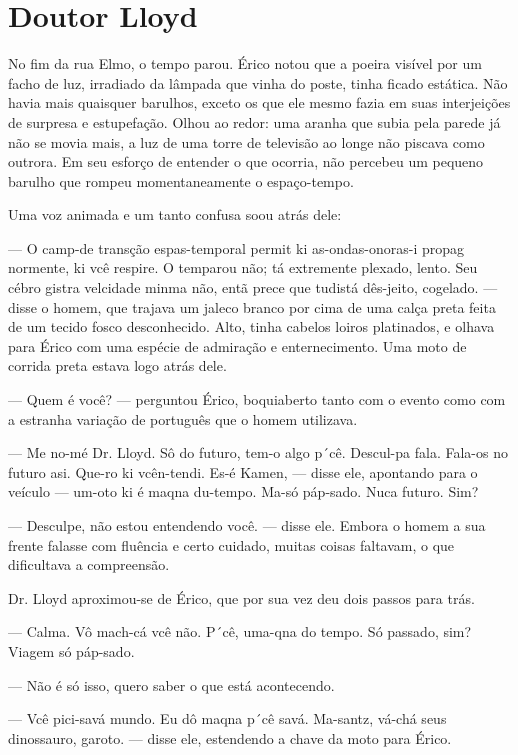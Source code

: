 \chapter{Doutor Lloyd}

No fim da rua Elmo, o tempo parou. Érico notou que a poeira visível por
um facho de luz, irradiado da lâmpada que vinha do poste, tinha ficado
estática. Não havia mais quaisquer barulhos, exceto os que ele mesmo
fazia em suas interjeições de surpresa e estupefação. Olhou ao redor:
uma aranha que subia pela parede já não se movia mais, a luz de uma
torre de televisão ao longe não piscava como outrora. Em seu esforço de
entender o que ocorria, não percebeu um pequeno barulho que rompeu
momentaneamente o espaço-tempo.

Uma voz animada e um tanto confusa soou atrás dele:

--- O camp-de transção espas-temporal permit ki as-ondas-onoras-i propag
normente, ki vcê respire. O temparou não; tá extremente plexado, lento.
Seu cébro gistra velcidade minma não, entã prece que tudistá dês-jeito,
cogelado. --- disse o homem, que trajava um jaleco branco por cima de uma
calça preta feita de um tecido fosco desconhecido. Alto, tinha cabelos
loiros platinados, e olhava para Érico com uma espécie de admiração e
enternecimento. Uma moto de corrida preta estava logo atrás dele.

--- Quem é você? --- perguntou Érico, boquiaberto tanto com o evento como
com a estranha variação de português que o homem utilizava.

--- Me no-mé Dr. Lloyd. Sô do futuro, tem-o algo p´cê. Descul-pa fala.
Fala-os no futuro asi. Que-ro ki vcên-tendi. Es-é Kamen, --- disse ele,
apontando para o veículo --- um-oto ki é maqna du-tempo. Ma-só páp-sado.
Nuca futuro. Sim?

--- Desculpe, não estou entendendo você. --- disse ele. Embora o homem a sua
frente falasse com fluência e certo cuidado, muitas coisas faltavam, o
que dificultava a compreensão.

Dr. Lloyd aproximou-se de Érico, que por sua vez deu dois passos para
trás.

--- Calma. Vô mach-cá vcê não. P´cê, uma-qna do tempo. Só passado, sim?
Viagem só páp-sado.

--- Não é só isso, quero saber o que está acontecendo.

--- Vcê pici-savá mundo. Eu dô maqna p´cê savá. Ma-santz, vá-chá seus
dinossauro, garoto. --- disse ele, estendendo a chave da moto para Érico.

